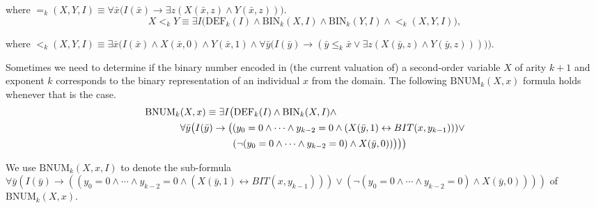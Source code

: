 \documentclass{article}
\begin{document}
\noindent
where ${=_k}(X, Y, I) \equiv \forall \bar{x} \big( I(\bar{x}) \to \exists z (X(\bar{x},z) \wedge Y(\bar{x}, z))\big)$.
\begin{equation}
X <_k Y \equiv \exists I \big(\mathrm{DEF}_k(I) \wedge \mathrm{BIN}_k(X, I) \wedge \mathrm{BIN}_k(Y,I) \wedge {<_k}(X, Y, I)\big) , \label{arith6} 
\end{equation}

\noindent
where ${<_k}(X, Y, I) \equiv \exists \bar{x} \big( I(\bar{x}) \wedge X(\bar{x}, 0) \wedge Y(\bar{x}, 1) \land \forall \bar{y} \big(I(\bar{y}) \to (\bar{y} \leq_k \bar{x} \vee \exists z (X(\bar{y},z) \wedge Y(\bar{y}, z)))\big)\big)$.

Sometimes we need to determine if the binary number encoded in (the current valuation of) a second-order variable $X$ of arity $k+1$ and exponent $k$ corresponds to the binary representation of an individual $x$ from the domain. The following $\mathrm{BNUM}_k(X,x)$ formula holds whenever that is the case.  
\begin{align}
    \mathrm{BNUM}_k&(X,x) \equiv 
\exists I \big(\mathrm{DEF}_k(I) \wedge \mathrm{BIN}_k(X,I) \wedge \notag \\
&    \forall \bar{y} \big(I(\bar{y}) \to \big((y_0 = 0 \wedge \cdots \wedge y_{k-2} = 0 \wedge (X(\bar{y}, 1) \leftrightarrow BIT(x, y_{k-1}))) \vee \notag \\
&     \hspace*{1.9cm}(\neg (y_0 = 0 \wedge \cdots \wedge y_{k-2} = 0) \wedge X(\bar{y},0))\big)\big)\big) \label{arith7}
\end{align}

We use $\mathrm{BNUM}_k(X,x,I)$ to denote the sub-formula $\forall \bar{y} (I(\bar{y}) \to ((y_0 = 0 \wedge \cdots \wedge y_{k-2} = 0 \wedge (X(\bar{y}, 1) \leftrightarrow BIT(x, y_{k-1}))) \vee (\neg (y_0 = 0 \wedge \cdots \wedge y_{k-2} = 0) \wedge X(\bar{y},0))))$ of $\mathrm{BNUM}_k(X,x)$.
\end{document}

